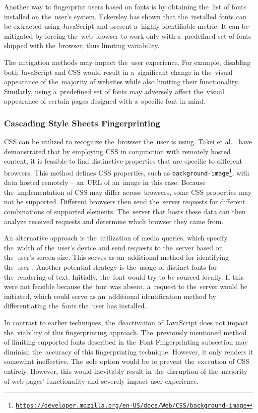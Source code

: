 Another way to fingerprint users based on fonts is by obtaining the~list of fonts installed on the~user's system. Eckersley \cite{eckersley} has shown that the~installed fonts can be extracted using JavaScript and present a~highly identifiable metric. It can be mitigated by forcing the~web browser to work only with a~predefined set of fonts shipped with the~browser, thus limiting variability. 

The mitigation methods may impact the~user experience. For example, disabling both JavaScript and CSS would result in a~significant change in the~visual appearance of the~majority of websites while also limiting their functionality. Similarly, using a~predefined set of fonts may adversely affect the~visual appearance of certain pages designed with a~specific font in mind.


\subsubsection{Cascading Style Sheets Fingerprinting}
CSS can be utilized to recognize the~browser the~user is using. Takei et al.~\cite{css-fingerprint} have demonstrated that by employing CSS in conjunction with remotely hosted content, it is feasible to find distinctive properties that are specific to different browsers. This method defines CSS properties, such as \texttt{background-image\footnote{\url{https://developer.mozilla.org/en-US/docs/Web/CSS/background-image}}}, with data hosted remotely -- an~URL of an~image in this case. Because the~implementation of CSS may differ across browsers, some CSS properties may not be supported. Different browsers then send the~server requests for different combinations of supported elements. The~server that hosts these data can then analyze received requests and determine which browser they came from.

An alternative approach is the~utilization of media queries, which specify the~width of the~user's device and send requests to the~server based on the~user's screen size. This serves as an~additional method for identifying the~user \cite{css-fingerprint}. Another potential strategy is the~usage of distinct fonts for the~rendering of text. Initially, the~font would try to be sourced locally. If this were not feasible because the~font was absent, a~request to the~server would be initiated, which could serve as an~additional identification method by differentiating the~fonts the~user has installed.

In contrast to earlier techniques, the~deactivation of JavaScript does not impact the~viability of this fingerprinting approach. The~previously mentioned method of limiting supported fonts described in the~Font Fingerprinting subsection may diminish the~accuracy of this fingerprinting technique. However, it only renders it somewhat ineffective. The~sole option would be to prevent the~execution of CSS  entirely. However, this would inevitably result in the~disruption of the~majority of web pages' functionality and severely impact user experience.


